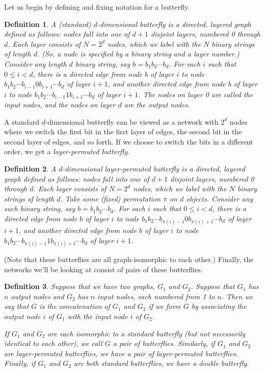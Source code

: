 \documentclass[12pt]{article}
\newtheorem{definition}{Definition}
\begin{document}
Let us begin by defining and fixing notation for a butterfly.
\begin{definition}
A \emph{(standard) $d$-dimensional butterfly} 
is a directed, layered graph defined as follows: 
nodes fall into one of $d+1$ disjoint layers, numbered 0 through $d$. Each
layer consists of $N=2^d$ nodes, which we label with the $N$ binary
strings of length $d$.  (So, a node is specified by a binary string and a
layer number.)
Consider any length $d$ binary string, say $b=b_{1}b_{2}\cdots b_{d}$.
For each $i$ such that $0\leq i <d$,
there is a directed edge from node $b$ of layer $i$ to node 
$b_{1}b_{2}\cdots b_{i-1}0 b_{i+1}\cdots b_{d}$ of layer $i+1$, and 
another directed edge from node $b$ of layer $i$ to node 
$b_{1}b_{2}\cdots b_{i-1}1 b_{i+1}\cdots b_{d}$ of layer $i+1$.
The nodes on layer 0 are called the input nodes, and the nodes on layer 
$d$ are the output nodes.
\end{definition}
A standard $d$-dimensional butterfly can be viewed as a network with 
$2^{d}$ nodes where we switch the first bit in the first layer
of edges, the second bit in the second layer of edges, and so forth.
If we choose to switch the bits in a different order, we get a
\emph{layer-permuted butterfly}.
\begin{definition}
A \emph{$d$-dimensional layer-permuted butterfly} 
is a directed, layered graph defined as follows: 
nodes fall into one of $d+1$ disjoint layers, numbered 0 through $d$. Each
layer consists of $N=2^d$ nodes, which we label with the $N$ binary
strings of length $d$.  Take some (fixed) permutation $\pi$ on $d$
objects.  Consider any such binary string, say $b=b_{1}b_{2}\cdots b_{d}$.
For each $i$ such that $0\leq i <d$,
there is a directed edge from node $b$ of layer $i$ to node 
$b_{1}b_{2}\cdots b_{\pi(i)-1}0 b_{\pi(i)+1}\cdots b_{d}$ of layer $i+1$, and 
another directed edge from node $b$ of layer $i$ to node 
$b_{1}b_{2}\cdots b_{\pi(i)-1}1 b_{\pi(i)+1}\cdots b_{d}$ of layer $i+1$.
\end{definition}
(Note that these butterflies are all graph-isomorphic to each other.)
Finally, the networks we'll be looking at consist of pairs of these
butterflies.
\begin{definition}
Suppose that we have two graphs, $G_{1}$ and $G_{2}$.  Suppose that 
$G_{1}$ has $n$ output nodes and $G_{2}$ has $n$ input nodes, each
numbered from 1 to $n$.  Then
we say that $G$ is the \emph{concatenation} of $G_{1}$ and $G_{2}$ if 
we form $G$ by associating the output node $i$ of $G_{1}$ with 
the input node $i$ of $G_{2}$.  
 
If $G_{1}$ and $G_{2}$ are each isomorphic to a standard butterfly
(but not necessarily identical to each other), we call $G$ 
a \emph{pair of butterflies}.  Similarly, if $G_{1}$ and $G_{2}$ are
layer-permuted butterflies, we have a 
\emph{pair of layer-permuted butterflies}.  Finally, if $G_{1}$ and 
$G_{2}$ are both standard butterflies, we have a \emph{double butterfly}.
\end{definition}
\end{document}
